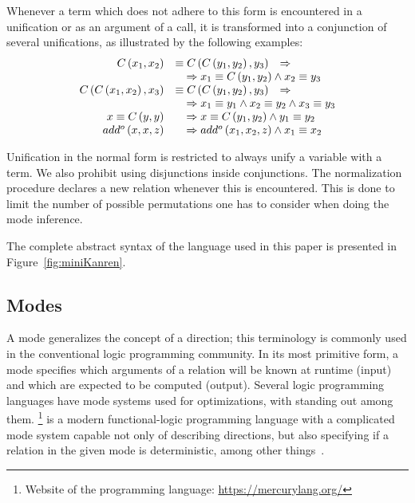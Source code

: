 Whenever a term which does not adhere to this form is encountered in a unification or as an argument of a call, it is transformed into a conjunction of several unifications, as illustrated by the following examples:
\[
    \begin{array}{rll}
        C\left( x_1, x_2 \right)                      & \equiv C\left( C\left( y_1, y_2 \right), y_3 \right)                                          & \Rightarrow \\
                                                      & \multicolumn{2}{l}{\quad\Rightarrow x_1 \equiv C\left( y_1, y_2 \right) \land x_2 \equiv y_3}               \\
        C\left( C\left( x_1, x_2 \right), x_3 \right) & \equiv C\left( C\left( y_1, y_2 \right), y_3 \right)                                          & \Rightarrow \\
                                                      & \multicolumn{2}{l}{\quad\Rightarrow x_1 \equiv y_1 \land x_2 \equiv y_2 \land x_3 \equiv y_3}               \\
        x \equiv C \left(y, y \right)                 & \multicolumn{2}{l}{\quad\Rightarrow x \equiv C \left(y_1, y_2\right) \land y_1 \equiv y_2}                  \\
        add^o\left( x, x, z \right)                   & \multicolumn{2}{l}{\quad\Rightarrow add^o\left( x_1, x_2, z \right) \land x_1 \equiv x_2}
    \end{array}
\]

Unification in the normal form is restricted to always unify a variable with a term.
We also prohibit using disjunctions inside conjunctions.
The normalization procedure declares a new relation whenever this is encountered.
This is done to limit the number of possible permutations one has to consider when doing the mode inference.

The complete abstract syntax of the \mk language used in this paper is presented in Figure~\ref{fig:miniKanren}.

\label{sec:mode}
\subsection{Modes}




A mode generalizes the concept of a direction; this terminology is commonly used in the conventional logic programming community.
In its most primitive form, a mode specifies which arguments of a relation will be known at runtime (input) and which are expected to be computed (output).
Several logic programming languages have mode systems used for optimizations, with \merc standing out among them.
\merc\footnote{Website of the \merc programming language: \url{https://mercurylang.org/}} is a modern functional-logic programming language with a complicated mode system capable not only of describing directions, but also specifying if a relation in the given mode is deterministic, among other things~\cite{overton2002constraint}.

